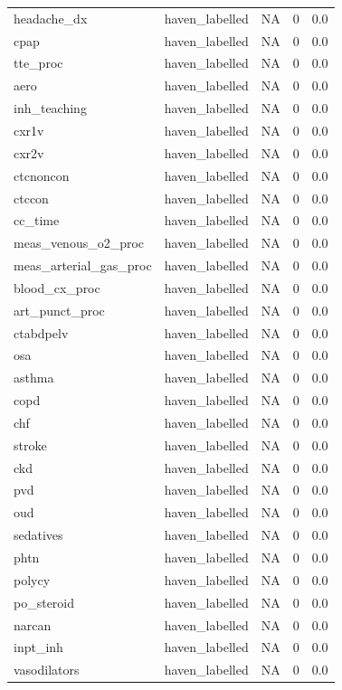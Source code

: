 \documentclass[
  11pt,
  letterpaper,
  DIV=11,
  numbers=noendperiod]{scrartcl}
\begin{document}
\begin{longtable*}{llrrr}
\addlinespace
headache\_dx & haven\_labelled & NA & 0 & 0.0\\
cpap & haven\_labelled & NA & 0 & 0.0\\
tte\_proc & haven\_labelled & NA & 0 & 0.0\\
aero & haven\_labelled & NA & 0 & 0.0\\
inh\_teaching & haven\_labelled & NA & 0 & 0.0\\
\addlinespace
cxr1v & haven\_labelled & NA & 0 & 0.0\\
cxr2v & haven\_labelled & NA & 0 & 0.0\\
ctcnoncon & haven\_labelled & NA & 0 & 0.0\\
ctccon & haven\_labelled & NA & 0 & 0.0\\
cc\_time & haven\_labelled & NA & 0 & 0.0\\
\addlinespace
meas\_venous\_o2\_proc & haven\_labelled & NA & 0 & 0.0\\
meas\_arterial\_gas\_proc & haven\_labelled & NA & 0 & 0.0\\
blood\_cx\_proc & haven\_labelled & NA & 0 & 0.0\\
art\_punct\_proc & haven\_labelled & NA & 0 & 0.0\\
ctabdpelv & haven\_labelled & NA & 0 & 0.0\\
\addlinespace
osa & haven\_labelled & NA & 0 & 0.0\\
asthma & haven\_labelled & NA & 0 & 0.0\\
copd & haven\_labelled & NA & 0 & 0.0\\
chf & haven\_labelled & NA & 0 & 0.0\\
stroke & haven\_labelled & NA & 0 & 0.0\\
\addlinespace
ckd & haven\_labelled & NA & 0 & 0.0\\
pvd & haven\_labelled & NA & 0 & 0.0\\
oud & haven\_labelled & NA & 0 & 0.0\\
sedatives & haven\_labelled & NA & 0 & 0.0\\
phtn & haven\_labelled & NA & 0 & 0.0\\
\addlinespace
polycy & haven\_labelled & NA & 0 & 0.0\\
po\_steroid & haven\_labelled & NA & 0 & 0.0\\
narcan & haven\_labelled & NA & 0 & 0.0\\
inpt\_inh & haven\_labelled & NA & 0 & 0.0\\
vasodilators & haven\_labelled & NA & 0 & 0.0\\

\end{longtable*}
\end{document}
